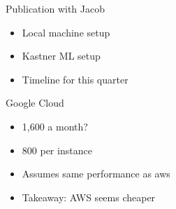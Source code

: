 \begin{frame}{Publication with Jacob}
    \begin{itemize}
        \item Local machine setup
        \item Kastner ML setup
        \item Timeline for this quarter
    \end{itemize}
\end{frame}

\begin{frame}{Google Cloud}
    \begin{itemize}
        \item 1,600 a month?
        \item 800 per instance
        \item Assumes same performance as aws
        \item Takeaway: AWS seems cheaper
    \end{itemize}
\end{frame}





